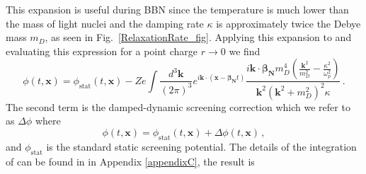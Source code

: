 This expansion is useful during BBN since the temperature is much lower than the mass of light nuclei and the damping rate $\kappa$ is approximately twice the Debye mass $m_D$, as seen in Fig.~\ref{RelaxationRate_fig}. Applying this expansion to  and evaluating this expression for a point charge $r \rightarrow 0$ we find
\begin{equation}\label{eq:ddsint}
\phi(t,\boldsymbol{x}) =\phi_{\text{stat}}(t,\boldsymbol{x})-Ze\int \frac{d^3\boldsymbol{k}}{(2\pi)^3} e^{ i\boldsymbol{k}\cdot(\boldsymbol{x}-\boldsymbol{\beta_{\text{N}}} t)}\frac{i \boldsymbol{k}\cdot \boldsymbol{\beta_{\text{N}}} m_D^4 (\frac{\boldsymbol{k}^2}{m_D^2} - \frac{\kappa^2}{\omega_p^2})}{\boldsymbol{k}^2(\boldsymbol{k}^2+m_D^2)^2\kappa}\,.
\end{equation}
The second term is the damped-dynamic screening correction which we refer to as $\Delta \phi$ where
\begin{equation}\label{eq:pos_point}
\phi(t,\boldsymbol{x}) = \phi_{\text{stat}}(t,\boldsymbol{x}) +\Delta \phi(t,\boldsymbol{x}) \,,
\end{equation}
and $\phi_{\text{stat}}$ is the standard static screening potential. The details of the integration of  can be found in \cite{Grayson:2023flr} in Appendix \ref{appendixC}, the result is
